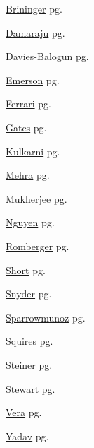 \item \hyperlink{Brininger.1}{Brininger} pg. \pageref{abs:Brininger}
\item \hyperlink{Damaraju.1}{Damaraju} pg. \pageref{abs:Damaraju}
\item \hyperlink{Davies-Balogun.1}{Davies-Balogun} pg. \pageref{abs:Davies-Balogun}
\item \hyperlink{Emerson.1}{Emerson} pg. \pageref{abs:Emerson}
\item \hyperlink{Ferrari.1}{Ferrari} pg. \pageref{abs:Ferrari}
\item \hyperlink{Gates.1}{Gates} pg. \pageref{abs:Gates}
\item \hyperlink{Kulkarni.1}{Kulkarni} pg. \pageref{abs:Kulkarni}
\item \hyperlink{Mehra.1}{Mehra} pg. \pageref{abs:Mehra}
\item \hyperlink{Mukherjee.1}{Mukherjee} pg. \pageref{abs:Mukherjee}
\item \hyperlink{Nguyen.1}{Nguyen} pg. \pageref{abs:Nguyen}
\item \hyperlink{Romberger.1}{Romberger} pg. \pageref{abs:Romberger}
\item \hyperlink{Short.1}{Short} pg. \pageref{abs:Short}
\item \hyperlink{Snyder.1}{Snyder} pg. \pageref{abs:Snyder}
\item \hyperlink{Sparrowmunoz.1}{Sparrowmunoz} pg. \pageref{abs:Sparrowmunoz}
\item \hyperlink{Squires.1}{Squires} pg. \pageref{abs:Squires}
\item \hyperlink{Steiner.1}{Steiner} pg. \pageref{abs:Steiner}
\item \hyperlink{Stewart.1}{Stewart} pg. \pageref{abs:Stewart}
\item \hyperlink{Vera.1}{Vera} pg. \pageref{abs:Vera}
\item \hyperlink{Yadav.1}{Yadav} pg. \pageref{abs:Yadav}
